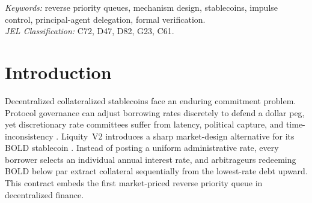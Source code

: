 \begin{abstract}
User-set-rate collateralized stablecoins replace governance rates with a decentralized reverse priority queue: borrowers post continuous annual interest rates to avoid stochastic par redemptions, while a seven-day cooldown penalty deters reactive rate jumps. We develop a unified equilibrium, mechanism-design, and agency theory for this market structure, paired with formal proofs and compiled contract benchmarks. First, we solve the continuous-time reverse priority queue in closed form, characterize its endogenous absorber pool and unique general-equilibrium peg-defense fixed point, prove strict deadweight loss from lumpy frictions under full yield recycling, and establish nonparametric identification with a mandatory inverse-square-root boundary singularity. Second, we prove that zero-extra-storage symmetric-commitment increment fees (Design~A\textsuperscript{*}) are the unique pointwise-minimal admissible rule, uncover a discontinuous Brownian phase transition in optimal cooldown length, and prove a flash-loan close-and-reopen impossibility theorem resolved by single-slot principal escrow (Design~D). Third, we analyze liability-side rate delegation via impulse control, discrete Edgeworth leapfrogging, and drain-proof co-pays. All core results are certified in Lean~4 across 113 theorems without custom axioms and verified in Solidity~0.8.24 across 130,000 fuzz runs.
\end{abstract}

\noindent\textit{Keywords:} reverse priority queues, mechanism design, stablecoins, impulse control, principal-agent delegation, formal verification.\\
\noindent\textit{JEL Classification:} C72, D47, D82, G23, C61.

\section{Introduction}\label{sec:intro}

Decentralized collateralized stablecoins face an enduring commitment problem. Protocol governance can adjust borrowing rates discretely to defend a dollar peg, yet discretionary rate committees suffer from latency, political capture, and time-inconsistency \citep{davernas2026can}. Liquity~V2 introduces a sharp market-design alternative for its BOLD stablecoin \citep{liquity2024whitepaper}. Instead of posting a uniform administrative rate, every borrower selects an individual annual interest rate, and arbitrageurs redeeming BOLD below par extract collateral sequentially from the lowest-rate debt upward. This contract embeds the first market-priced reverse priority queue in decentralized finance.


